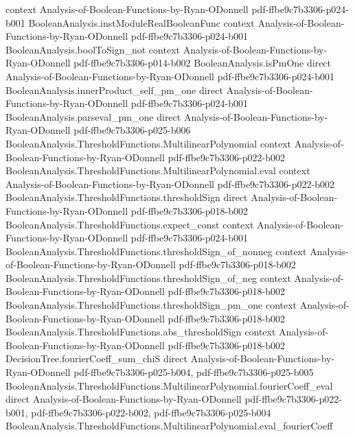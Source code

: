 \begin{lemma}
  {context}
  {Analysis-of-Boolean-Functions-by-Ryan-ODonnell}
  {pdf-ffbe9c7b3306-p024-b001}
\proofstep
  {BooleanAnalysis.instModuleRealBooleanFunc}
  {context}
  {Analysis-of-Boolean-Functions-by-Ryan-ODonnell}
  {pdf-ffbe9c7b3306-p024-b001}
\proofstep
  {BooleanAnalysis.boolToSign_not}
  {context}
  {Analysis-of-Boolean-Functions-by-Ryan-ODonnell}
  {pdf-ffbe9c7b3306-p014-b002}
\proofstep
  {BooleanAnalysis.isPmOne}
  {direct}
  {Analysis-of-Boolean-Functions-by-Ryan-ODonnell}
  {pdf-ffbe9c7b3306-p024-b001}
\proofstep
  {BooleanAnalysis.innerProduct_self_pm_one}
  {direct}
  {Analysis-of-Boolean-Functions-by-Ryan-ODonnell}
  {pdf-ffbe9c7b3306-p024-b001}
\proofstep
  {BooleanAnalysis.parseval_pm_one}
  {direct}
  {Analysis-of-Boolean-Functions-by-Ryan-ODonnell}
  {pdf-ffbe9c7b3306-p025-b006}
\proofstep
  {BooleanAnalysis.ThresholdFunctions.MultilinearPolynomial}
  {context}
  {Analysis-of-Boolean-Functions-by-Ryan-ODonnell}
  {pdf-ffbe9c7b3306-p022-b002}
\proofstep
  {BooleanAnalysis.ThresholdFunctions.MultilinearPolynomial.eval}
  {context}
  {Analysis-of-Boolean-Functions-by-Ryan-ODonnell}
  {pdf-ffbe9c7b3306-p022-b002}
\proofstep
  {BooleanAnalysis.ThresholdFunctions.thresholdSign}
  {direct}
  {Analysis-of-Boolean-Functions-by-Ryan-ODonnell}
  {pdf-ffbe9c7b3306-p018-b002}
\proofstep
  {BooleanAnalysis.ThresholdFunctions.expect_const}
  {context}
  {Analysis-of-Boolean-Functions-by-Ryan-ODonnell}
  {pdf-ffbe9c7b3306-p024-b001}
\proofstep
  {BooleanAnalysis.ThresholdFunctions.thresholdSign_of_nonneg}
  {context}
  {Analysis-of-Boolean-Functions-by-Ryan-ODonnell}
  {pdf-ffbe9c7b3306-p018-b002}
\proofstep
  {BooleanAnalysis.ThresholdFunctions.thresholdSign_of_neg}
  {context}
  {Analysis-of-Boolean-Functions-by-Ryan-ODonnell}
  {pdf-ffbe9c7b3306-p018-b002}
\proofstep
  {BooleanAnalysis.ThresholdFunctions.thresholdSign_pm_one}
  {context}
  {Analysis-of-Boolean-Functions-by-Ryan-ODonnell}
  {pdf-ffbe9c7b3306-p018-b002}
\proofstep
  {BooleanAnalysis.ThresholdFunctions.abs_thresholdSign}
  {context}
  {Analysis-of-Boolean-Functions-by-Ryan-ODonnell}
  {pdf-ffbe9c7b3306-p018-b002}
\proofstep
  {DecisionTree.fourierCoeff_sum_chiS}
  {direct}
  {Analysis-of-Boolean-Functions-by-Ryan-ODonnell}
  {pdf-ffbe9c7b3306-p025-b004,
    pdf-ffbe9c7b3306-p025-b005}
\proofstep
  {BooleanAnalysis.ThresholdFunctions.MultilinearPolynomial.fourierCoeff_eval}
  {direct}
  {Analysis-of-Boolean-Functions-by-Ryan-ODonnell}
  {pdf-ffbe9c7b3306-p022-b001,
    pdf-ffbe9c7b3306-p022-b002,
    pdf-ffbe9c7b3306-p025-b004}
\proofstep
  {BooleanAnalysis.ThresholdFunctions.MultilinearPolynomial.eval_fourierCoeff}

\end{lemma}
